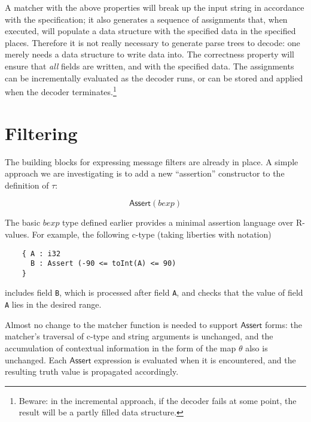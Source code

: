 \documentclass[svgnames]{llncs}
\newcommand{\konst}[1]{\ensuremath{\mathsf{#1}}}
\begin{document}
A matcher with the above properties will break up the input string in
accordance with the specification; it also generates a sequence of
assignments that, when executed, will populate a data structure with
the specified data in the specified places. Therefore it is not really
necessary to generate parse trees to decode: one merely needs a data
structure to write data into. The correctness property will ensure
that \emph{all} fields are written, and with the specified data. The
assignments can be incrementally evaluated as the decoder runs, or can
be stored and applied when the decoder terminates.\footnote{Beware: in
  the incremental approach, if the decoder fails at some point, the
  result will be a partly filled data structure.}



\section{Filtering}

The building blocks for expressing message filters are already in
place. A simple approach we are investigating is to add a new
``assertion'' constructor to the definition of $\tau$:

\[
  \konst{Assert}(\mathit{bexp})
\]

The basic $\mathit{bexp}$ type defined earlier provides a minimal
assertion language over R-values. For example, the following c-type
(taking liberties with notation)

\begin{verbatim}
    { A : i32
      B : Assert (-90 <= toInt(A) <= 90)
    }
\end{verbatim}

\noindent includes field \verb+B+, which is processed after field
\verb+A+, and checks that the value of field \verb+A+ lies in the
desired range.

Almost no change to the matcher function is needed to support
\konst{Assert} forms: the matcher's traversal of c-type and string
arguments is unchanged, and the accumulation of contextual information
in the form of the map $\theta$ also is unchanged. Each \konst{Assert}
expression is evaluated when it is encountered, and the resulting
truth value is propagated accordingly.


\end{document}
